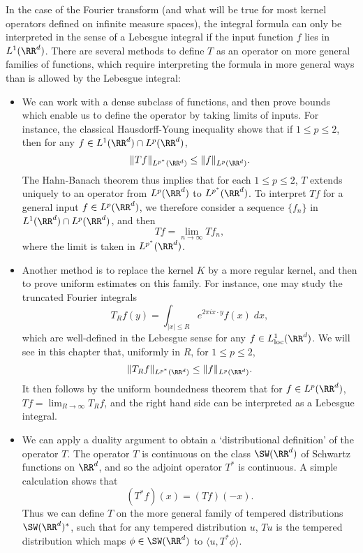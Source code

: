 In the case of the Fourier transform (and what will be true for most kernel operators defined on infinite measure spaces), the integral formula can only be interpreted in the sense of a Lebesgue integral if the input function $f$ lies in $L^1(\RR^d)$. There are several methods to define $T$ as an operator on more general families of functions, which require interpreting the formula in more general ways than is allowed by the Lebesgue integral:
%
\begin{itemize}
    \item We can work with a dense subclass of functions, and then prove bounds which enable us to define the operator by taking limits of inputs. For instance, the classical Hausdorff-Young inequality shows that if $1 \leq p \leq 2$, then for any $f \in L^1(\RR^d) \cap L^p(\RR^d)$,
    \[ \| Tf \|_{L^{p^*}(\RR^d)} \leq \| f \|_{L^p(\RR^d)}. \]
    The Hahn-Banach theorem thus implies that for each $1 \leq p \leq 2$, $T$ extends uniquely to an operator from $L^p(\RR^d)$ to $L^{p^*}(\RR^d)$. To interpret $Tf$ for a general input $f \in L^p(\RR^d)$, we therefore consider a sequence $\{ f_n \}$ in $L^1(\RR^d) \cap L^p(\RR^d)$, and then
    \[ Tf = \lim_{n \to \infty} Tf_n, \]
    where the limit is taken in $L^{p^*}(\RR^d)$.

    \item Another method is to replace the kernel $K$ by a more regular kernel, and then to prove uniform estimates on this family. For instance, one may study the truncated Fourier integrals
    \[ T_R f(y) = \int_{|x| \leq R} e^{2 \pi i x \cdot y} f(x)\; dx, \]
    which are well-defined in the Lebesgue sense for any $f \in L^1_{\text{loc}}(\RR^d)$. We will see in this chapter that, uniformly in $R$, for $1 \leq p \leq 2$,
    \[ \| T_R f \|_{L^{p^*}(\RR^d)} \leq \| f \|_{L^p(\RR^d)}. \]    
    It then follows by the uniform boundedness theorem that for $f \in L^p(\RR^d)$, $Tf = \lim_{R \to \infty} T_R f$, and the right hand side can be interpreted as a Lebesgue integral.

    \item We can apply a duality argument to obtain a `distributional definition' of the operator $T$. The operator $T$ is continuous on the class $\SW(\RR^d)$ of Schwartz functions on $\RR^d$, and so the adjoint operator $T^*$ is continuous. A simple calculation shows that
    \[ (T^* f)(x) = (Tf)(-x). \]
    Thus we can define $T$ on the more general family of tempered distributions $\SW(\RR^d)^*$, such that for any tempered distribution $u$, $Tu$ is the tempered distribution which maps $\phi \in \SW(\RR^d)$ to $\langle u, T^* \phi \rangle$.
\end{itemize}








